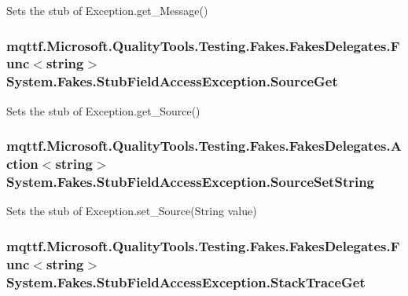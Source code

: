 Sets the stub of Exception.\-get\-\_\-\-Message()

\hypertarget{class_system_1_1_fakes_1_1_stub_field_access_exception_a59782a28c6a9f504698d0aaeaee3f3c8}{
\subsubsection[{Source\-Get}]{\setlength{\rightskip}{0pt plus 5cm}mqttf.\-Microsoft.\-Quality\-Tools.\-Testing.\-Fakes.\-Fakes\-Delegates.\-Func$<$string$>$ System.\-Fakes.\-Stub\-Field\-Access\-Exception.\-Source\-Get}}\label{class_system_1_1_fakes_1_1_stub_field_access_exception_a59782a28c6a9f504698d0aaeaee3f3c8}


Sets the stub of Exception.\-get\-\_\-\-Source()

\hypertarget{class_system_1_1_fakes_1_1_stub_field_access_exception_a7ca9dfd2ce30a1f6e7d0561e544f68fd}{
\subsubsection[{Source\-Set\-String}]{\setlength{\rightskip}{0pt plus 5cm}mqttf.\-Microsoft.\-Quality\-Tools.\-Testing.\-Fakes.\-Fakes\-Delegates.\-Action$<$string$>$ System.\-Fakes.\-Stub\-Field\-Access\-Exception.\-Source\-Set\-String}}\label{class_system_1_1_fakes_1_1_stub_field_access_exception_a7ca9dfd2ce30a1f6e7d0561e544f68fd}


Sets the stub of Exception.\-set\-\_\-\-Source(\-String value)

\hypertarget{class_system_1_1_fakes_1_1_stub_field_access_exception_a73f3d1685d69eda2a1101187a97832a4}{
\subsubsection[{Stack\-Trace\-Get}]{\setlength{\rightskip}{0pt plus 5cm}mqttf.\-Microsoft.\-Quality\-Tools.\-Testing.\-Fakes.\-Fakes\-Delegates.\-Func$<$string$>$ System.\-Fakes.\-Stub\-Field\-Access\-Exception.\-Stack\-Trace\-Get}}\label{class_system_1_1_fakes_1_1_stub_field_access_exception_a73f3d1685d69eda2a1101187a97832a4}


